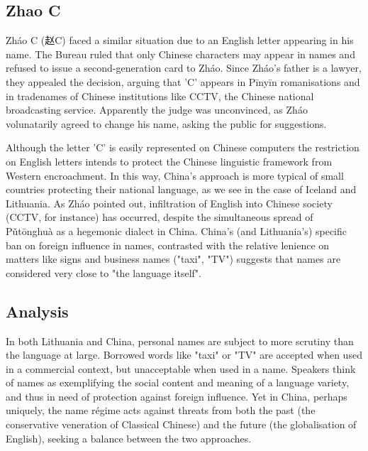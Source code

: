 \subsection{Zhao C}

Zháo C ({\zafont 赵}C) faced a similar situation due to an English letter
appearing in his name. The Bureau ruled that only Chinese characters may appear
in names and refused to issue a second-generation card to Zháo. Since Zháo's
father is a lawyer, they appealed the decision, arguing that 'C' appears in
Pīnyīn romanisations and in tradenames of Chinese institutions like CCTV, the
Chinese national broadcasting service. Apparently the judge was unconvinced, as
Zháo volunatarily agreed to change his name, asking the public for suggestions.
\parencite{martinsen09}

Although the letter 'C' is easily represented on Chinese computers the
restriction on English letters intends to protect the Chinese linguistic
framework from Western encroachment. In this way, China's approach is more
typical of small countries protecting their national language, as we see in the
case of Iceland and Lithuania. As Zháo pointed out, infiltration of English into
Chinese society (CCTV, for instance) has occurred, despite the simultaneous
spread of Pǔtōnghuà as a hegemonic dialect in China. China's (and Lithuania's)
specific ban on foreign influence in names, contrasted with the relative
lenience on matters like signs and business names ("taxi", "TV") suggests that
names are considered very close to "the language itself".

\subsection{Analysis}

In both Lithuania and China, personal names are subject to more scrutiny than
the language at large. Borrowed words like "taxi" or "TV" are accepted when used
in a commercial context, but unacceptable when used in a name. Speakers think of
names as exemplifying the social content and meaning of a language variety, and
thus in need of protection against foreign influence. Yet in China, perhaps
uniquely, the name régime acts against threats from both the past (the
conservative veneration of Classical Chinese) and the future (the globalisation
of English), seeking a balance between the two approaches.
